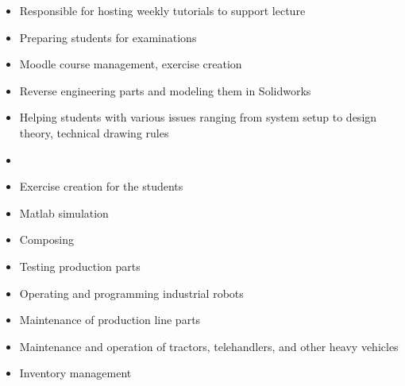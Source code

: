 \documentclass[10pt,a4paper,ragged2e,withhyper]{altacv}
\begin{document}
\begin{paracol}{2}


\begin{itemize}
\item Responsible for hosting weekly tutorials to support lecture
\item Preparing students for examinations
\item Moodle course management, exercise creation 
\end{itemize}

\divider

\begin{itemize}
\item Reverse engineering parts and modeling them in Solidworks
\item Helping students with various issues ranging from system setup to design theory, technical drawing rules
\item 
\end{itemize}

\divider

\begin{itemize}
\item Exercise creation for the students
\item Matlab simulation
\item Composing
\end{itemize}

\divider

\begin{itemize}
\item Testing production parts
\item Operating and programming industrial robots
\item Maintenance of production line parts
\end{itemize}

\divider

\begin{itemize}
  \item Maintenance and operation of tractors, telehandlers, and other heavy vehicles
  \item Inventory management
\end{itemize}


\end{paracol}
\end{document}

